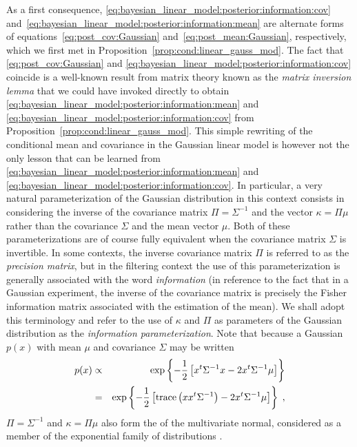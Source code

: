 As a first consequence,
\eqref{eq:bayesian_linear_model:posterior:information:cov}
and~\eqref{eq:bayesian_linear_model:posterior:information:mean} are alternate
forms of equations~\eqref{eq:post_cov:Gaussian}
and~\eqref{eq:post_mean:Gaussian}, respectively, which we first met in
Proposition~\ref{prop:cond:linear_gauss_mod}. The fact that
\eqref{eq:post_cov:Gaussian} and
\eqref{eq:bayesian_linear_model:posterior:information:cov} coincide is a well-known result from matrix theory known as the 
{\em matrix inversion lemma} that we could have invoked directly to
obtain \eqref{eq:bayesian_linear_model:posterior:information:mean}
and \eqref{eq:bayesian_linear_model:posterior:information:cov} from
Proposition~\ref{prop:cond:linear_gauss_mod}. This simple rewriting of the
conditional mean and covariance in the Gaussian linear model is however not the
only lesson that can be learned
from \eqref{eq:bayesian_linear_model:posterior:information:mean}
and \eqref{eq:bayesian_linear_model:posterior:information:cov}. In particular,
a very natural parameterization of the Gaussian distribution in this context
consists in considering the inverse of the covariance matrix $\Pi =
\Sigma^{-1}$ and the vector $\kappa = \Pi \mu$ rather than the covariance
$\Sigma$ and the mean vector $\mu$. Both of these parameterizations are of
course fully equivalent when the covariance matrix $\Sigma$ is invertible. In
some contexts, the inverse covariance matrix $\Pi$ is referred to as the
 \emph{precision matrix}, but in the filtering context the use of this
parameterization is generally associated with the word {\em information} (in
reference to the fact that in a Gaussian experiment, the inverse of the
covariance matrix is precisely the Fisher information matrix associated with the
estimation of the mean). We shall adopt this terminology and refer to the use
of $\kappa$ and $\Pi$ as parameters of the Gaussian distribution as the
{\em information parameterization}. Note that because a Gaussian \pdf\ $p(x)$
with mean $\mu$ and covariance $\Sigma$ may
be written
\begin{eqnarray*}
  p(x) & \propto &
  \exp \left\{ -\frac12 \left[x^t \Sigma^{-1} x - 2 x^t \Sigma^{-1}\mu \right] \right\} \\
& = & \exp \left\{ -\frac12 \left[\operatorname{trace}\left(x x^t \Sigma^{-1} \right) - 2 x^t \Sigma^{-1}\mu \right] \right\} \; ,
\end{eqnarray*}
$\Pi = \Sigma^{-1}$ and $\kappa = \Pi \mu$ also form the
of the multivariate normal, considered as a member of the exponential family
of distributions \cite{lehmann:casella:1998}.

